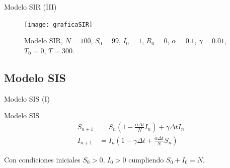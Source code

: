\begin{frame}{Modelo SIR (III)}
    \begin{figure}
        \begin{center}
        \caption{Modelo SIR, $N=100$, $S_0=99$, $I_0 = 1$, $R_0 = 0$, $\alpha = 0.1$, $\gamma = 0.01$, $T_0 = 0$, $T = 300$.}
        \texttt{[image: graficaSIR]}
        \end{center}
    \end{figure}
\end{frame}


\subsection{Modelo SIS}


\begin{frame}{Modelo SIS (I)}
    \begin{block}{Modelo SIS \cite{allenDiscretetimeSISIR1994}\cite{brauerMathematicalModelsPopulation2012}\cite{salinelliDiscreteDynamicalModels2014}}
        \begin{equation}
            \label{eqn: modelo_SIS}
            \begin{aligned}
            S_{n+1} & = S_n \left(1-\frac{\alpha\Delta t}{N} I_n \right) + \gamma \Delta t I_n \\
            I_{n+1} & = I_n \left( 1-\gamma \Delta t + \frac{\alpha\Delta t}{N} S_n \right)
            \end{aligned}
            \end{equation}
            
            Con condiciones iniciales $S_0>0$, $I_0>0$ cumpliendo $S_0+I_0=N$.
    \end{block}

    \begin{center}
        \end{center}

\end{frame}


